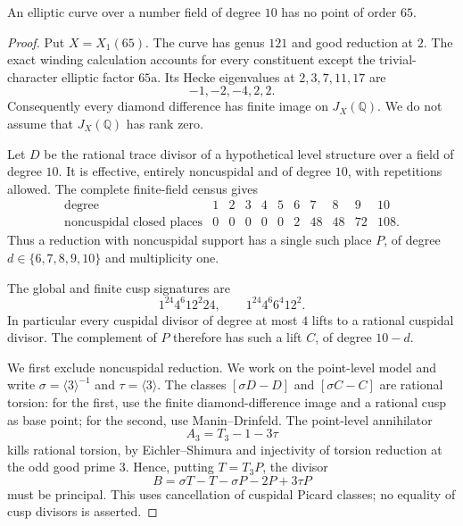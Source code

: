 \begin{proposition}\label{prop:decic-no65}
An elliptic curve over a number field of degree $10$ has no point of
order $65$.
\end{proposition}
\begin{proof}
Put $X=X_1(65)$. The curve has genus $121$ and good reduction at $2$.
The exact winding calculation accounts for every constituent except
the trivial-character elliptic factor $65\mathrm a$. Its Hecke
eigenvalues at $2,3,7,11,17$ are
\[
                         -1,-2,-4,2,2.
\]
Consequently every diamond difference has finite image on
$J_X(\mathbb Q)$. We do not assume that $J_X(\mathbb Q)$ has rank zero.

Let $D$ be the rational trace divisor of a hypothetical level
structure over a field of degree $10$. It is effective, entirely
noncuspidal and of degree $10$, with repetitions allowed. The
complete finite-field census gives
\[
\begin{array}{c|rrrrrrrrrr}
 \text{degree}&1&2&3&4&5&6&7&8&9&10\\ \hline
 \text{noncuspidal closed places}&0&0&0&0&0&2&48&48&72&108.
\end{array}
\]
Thus a reduction with noncuspidal support has a single such place
$P$, of degree $d\in\{6,7,8,9,10\}$ and multiplicity one.

The global and finite cusp signatures are
\[
 1^{24}4^6 12^2 24,\qquad 1^{24}4^6 6^4 12^2.
\]
In particular every cuspidal divisor of degree at most $4$ lifts to
a rational cuspidal divisor. The complement of $P$ therefore has
such a lift $C$, of degree $10-d$.

We first exclude noncuspidal reduction. We work on the point-level
model and write $\sigma=\langle3\rangle^{-1}$ and
$\tau=\langle3\rangle$. The classes $[\sigma D-D]$ and
$[\sigma C-C]$ are rational torsion: for the first, use the finite
diamond-difference image and a rational cusp as base point; for the
second, use Manin--Drinfeld. The point-level annihilator
\[
                           A_3=T_3-1-3\tau
\]
kills rational torsion, by Eichler--Shimura and injectivity of torsion
reduction at the odd good prime $3$. Hence, putting $T=T_3P$, the
divisor
\[
 B=\sigma T-T-\sigma P-2P+3\tau P                         \tag{65.1}
\]
must be principal. This uses cancellation of cuspidal Picard classes;
no equality of cusp divisors is asserted.


\end{proof}
